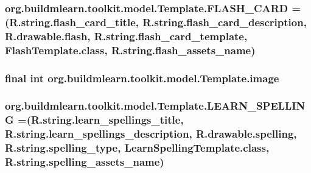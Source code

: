 \subsubsection[{\texorpdfstring{F\+L\+A\+S\+H\+\_\+\+C\+A\+RD}{FLASH_CARD}}]{\setlength{\rightskip}{0pt plus 5cm}org.\+buildmlearn.\+toolkit.\+model.\+Template.\+F\+L\+A\+S\+H\+\_\+\+C\+A\+RD =(R.\+string.\+flash\+\_\+card\+\_\+title, R.\+string.\+flash\+\_\+card\+\_\+description, R.\+drawable.\+flash, R.\+string.\+flash\+\_\+card\+\_\+template, Flash\+Template.\+class, R.\+string.\+flash\+\_\+assets\+\_\+name)}\hypertarget{enumorg_1_1buildmlearn_1_1toolkit_1_1model_1_1Template_a320459af7080ce10a9bbca2f60224865}{}\label{enumorg_1_1buildmlearn_1_1toolkit_1_1model_1_1Template_a320459af7080ce10a9bbca2f60224865}
\subsubsection[{\texorpdfstring{image}{image}}]{\setlength{\rightskip}{0pt plus 5cm}final int org.\+buildmlearn.\+toolkit.\+model.\+Template.\+image\hspace{0.3cm}{\ttfamily [private]}}\hypertarget{enumorg_1_1buildmlearn_1_1toolkit_1_1model_1_1Template_af9b3693a4fd2a12e49bbfa55a6ac2d3a}{}\label{enumorg_1_1buildmlearn_1_1toolkit_1_1model_1_1Template_af9b3693a4fd2a12e49bbfa55a6ac2d3a}
\subsubsection[{\texorpdfstring{L\+E\+A\+R\+N\+\_\+\+S\+P\+E\+L\+L\+I\+NG}{LEARN_SPELLING}}]{\setlength{\rightskip}{0pt plus 5cm}org.\+buildmlearn.\+toolkit.\+model.\+Template.\+L\+E\+A\+R\+N\+\_\+\+S\+P\+E\+L\+L\+I\+NG =(R.\+string.\+learn\+\_\+spellings\+\_\+title, R.\+string.\+learn\+\_\+spellings\+\_\+description, R.\+drawable.\+spelling, R.\+string.\+spelling\+\_\+type, Learn\+Spelling\+Template.\+class, R.\+string.\+spelling\+\_\+assets\+\_\+name)}\hypertarget{enumorg_1_1buildmlearn_1_1toolkit_1_1model_1_1Template_ac92d5f18de318d36ba42ae0aba85576d}{}\label{enumorg_1_1buildmlearn_1_1toolkit_1_1model_1_1Template_ac92d5f18de318d36ba42ae0aba85576d}
